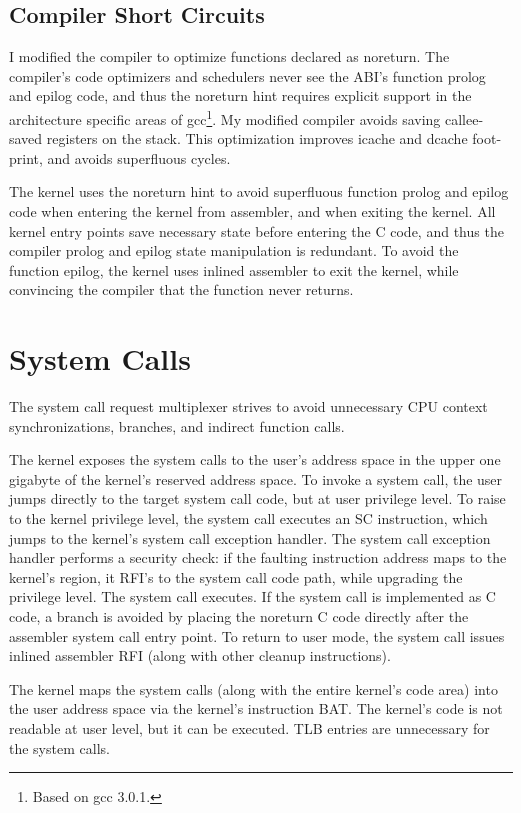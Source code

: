 \documentclass[a4paper]{article}
\newcommand{\code}[1]{\textsf{#1}}
\newcommand{\SC}{\code{SC}}
\newcommand{\RFI}{\code{RFI}}
\begin{document}
\subsection{Compiler Short Circuits}
I modified the compiler to optimize functions declared as 
\code{noreturn}.  The compiler's code optimizers and schedulers never see
the ABI's function prolog and epilog code, and thus the \code{noreturn}
hint requires explicit support in the architecture specific areas of
gcc\footnote{Based on gcc 3.0.1.}.  My modified compiler avoids saving 
callee-saved registers on the stack.  This optimization improves icache
and dcache foot-print, and avoids superfluous cycles.

The kernel uses the \code{noreturn} hint to avoid superfluous function 
prolog and 
epilog code when entering the kernel from assembler, and when exiting the 
kernel.  All kernel entry points save necessary state before entering the 
C code, and thus the compiler prolog and epilog state manipulation is 
redundant.  To avoid the function epilog, the kernel uses inlined assembler
to exit the kernel, while convincing the compiler that the function never
returns.


\section{System Calls}
The system call request multiplexer strives to avoid unnecessary CPU context
synchronizations, branches, and indirect function calls.

The kernel exposes the system calls to the user's address space in the
upper one gigabyte of the kernel's reserved address space.  To invoke a 
system call, the user jumps directly to the target system call code, but
at user privilege level.  To raise to the kernel privilege level, the system
call executes an \SC{} instruction, which jumps to the kernel's system call
exception handler.  The system call exception handler performs a security
check: if the faulting instruction address maps to the kernel's region,
it \RFI{}'s to the system call code path, while upgrading the privilege 
level.
The system call executes.  If the system call is implemented as C code,
a branch is avoided by placing the \code{noreturn} C code directly after
the assembler system call entry point.  To return to user mode, the system
call issues inlined assembler \RFI{} (along with other cleanup instructions).

The kernel maps the system calls (along with the entire kernel's code area)
into the user address space via the kernel's instruction BAT.    The kernel's
code is not readable at user level, but it can be executed.  TLB entries are
unnecessary for the system calls.
\end{document}

